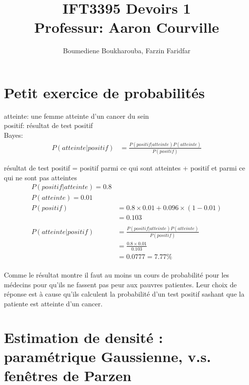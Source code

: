 \documentclass{article}
\title{IFT3395 Devoirs 1 \\ \normalsize Professur: Aaron Courville}
\author{Boumediene Boukharouba, Farzin Faridfar}
\begin{document}
\maketitle

\section{Petit exercice de probabilités}

atteinte: une femme atteinte d’un cancer du sein \\
positif: résultat de test positif\\

Bayes:
\begin{align*}
  P(atteinte|positif)&=\frac{P(positif|atteinte)P(atteinte)}{P(positif)}
\end{align*}

résultat de test positif = positif parmi ce qui sont atteintes + positif et
parmi ce qui ne sont pas atteintes
\begin{align*}
  P(positif|atteinte) = 0.8\\
  P(atteinte) = 0.01\\
  P(positif) &= 0.8 \times 0.01 + 0.096 \times (1 - 0.01)\\
             &= 0.103\\
  \\
  P(atteinte|positif)&=\frac{P(positif|atteinte)P(atteinte)}{P(positif)}\\
             &=\frac{0.8 \times 0.01}{0.103}\\
             & = 0.0777 = 7.77\%
\end{align*}

\paragraph{}
Comme le résultat montre il faut au moins un cours de probabilité pour
les médecins pour qu'ils ne fassent pas peur aux pauvres
patientes. Leur choix de réponse est à cause qu'ils calculent la
probabilité d'un test positif sashant que la patiente est atteinte
d'un cancer.

\section{Estimation de densité : paramétrique Gaussienne, v.s. fenêtres de Parzen}
\end{document}
